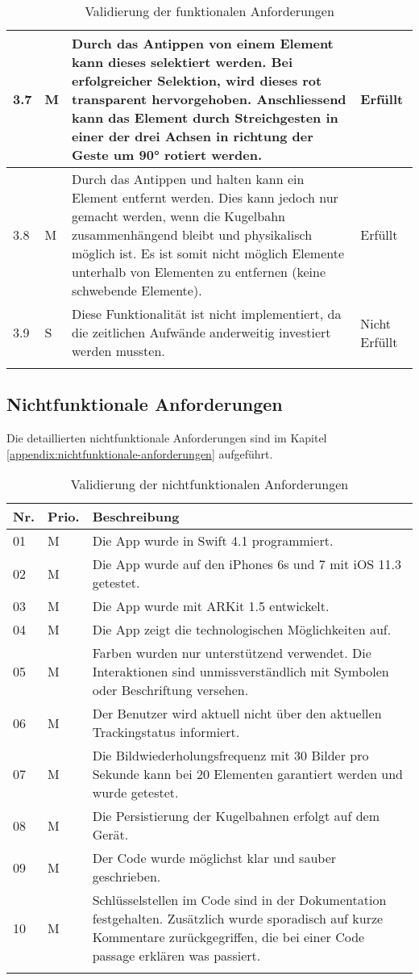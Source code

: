\begin{longtable}{l l p{10cm} l}
	\hline
	3.7 & M & Durch das Antippen von einem Element kann dieses selektiert werden. Bei erfolgreicher Selektion, wird dieses rot transparent hervorgehoben. Anschliessend kann das Element durch Streichgesten in einer der drei Achsen in richtung der Geste um 90° rotiert werden. & Erfüllt \\
	\hline
	3.8 & M & Durch das Antippen und halten kann ein Element entfernt werden. Dies kann jedoch nur gemacht werden, wenn die Kugelbahn zusammenhängend bleibt und physikalisch möglich ist. Es ist somit nicht möglich Elemente unterhalb von Elementen zu entfernen (keine schwebende Elemente). & Erfüllt \\
	\hline
	3.9 & S & Diese Funktionalität ist nicht implementiert, da die zeitlichen Aufwände anderweitig investiert werden mussten. & Nicht Erfüllt \\
	\hline
	\caption{Validierung der funktionalen Anforderungen}
\end{longtable}


\subsection{Nichtfunktionale Anforderungen}


Die detaillierten nichtfunktionale Anforderungen sind im Kapitel \ref{appendix:nichtfunktionale-anforderungen} aufgeführt.

\begin{longtable}{l l p{13cm}}
	\hline
	\textbf{Nr.} & \textbf{Prio.} & \textbf{Beschreibung} \\
	\hline
	01 & M & Die App wurde in Swift 4.1 programmiert. \\
	02 & M & Die App wurde auf den iPhones 6s und 7 mit iOS 11.3 getestet. \\
	03 & M & Die App wurde mit ARKit 1.5 entwickelt. \\
	04 & M & Die App zeigt die technologischen Möglichkeiten auf. \\
	05 & M & Farben wurden nur unterstützend verwendet. Die Interaktionen sind unmissverständlich mit Symbolen oder Beschriftung versehen. \\ 
	06 & M & Der Benutzer wird aktuell nicht über den aktuellen Trackingstatus informiert. \\
	07 & M & Die Bildwiederholungsfrequenz mit 30 Bilder pro Sekunde kann bei 20 Elementen garantiert werden und wurde getestet. \\
	08 & M & Die Persistierung der Kugelbahnen erfolgt auf dem Gerät. \\
	09 & M & Der Code wurde möglichst klar und sauber geschrieben. \\
	10 & M & Schlüsselstellen im Code sind in der Dokumentation festgehalten. Zusätzlich wurde sporadisch auf kurze Kommentare zurückgegriffen, die bei einer Code passage erklären was passiert. \\
	\hline
	\caption{Validierung der nichtfunktionalen Anforderungen}
\end{longtable}


